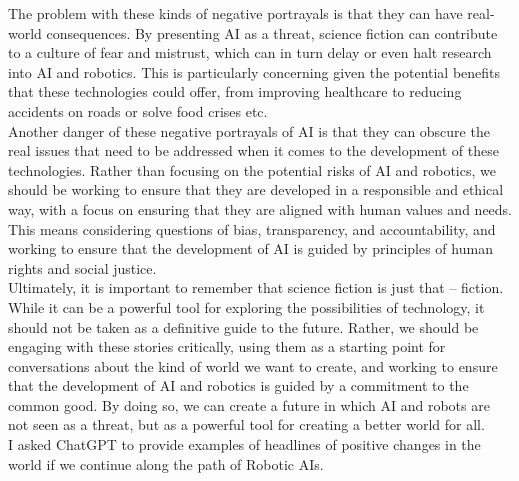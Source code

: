 \documentclass{article}
\begin{document}
The problem with these kinds of negative portrayals is that they can have real-world consequences. By presenting AI as a threat, science fiction can contribute to a culture of fear and mistrust, which can in turn delay or even halt research into AI and robotics. This is particularly concerning given the potential benefits that these technologies could offer, from improving healthcare to reducing accidents on roads or solve food crises etc.\\

Another danger of these negative portrayals of AI is that they can obscure the real issues that need to be addressed when it comes to the development of these technologies. Rather than focusing on the potential risks of AI and robotics, we should be working to ensure that they are developed in a responsible and ethical way, with a focus on ensuring that they are aligned with human values and needs. This means considering questions of bias, transparency, and accountability, and working to ensure that the development of AI is guided by principles of human rights and social justice.\\

Ultimately, it is important to remember that science fiction is just that – fiction. While it can be a powerful tool for exploring the possibilities of technology, it should not be taken as a definitive guide to the future. Rather, we should be engaging with these stories critically, using them as a starting point for conversations about the kind of world we want to create, and working to ensure that the development of AI and robotics is guided by a commitment to the common good. By doing so, we can create a future in which AI and robots are not seen as a threat, but as a powerful tool for creating a better world for all.\\

I asked ChatGPT to provide examples of headlines of positive changes in the world if we continue along the path of Robotic AIs.
\end{document}
